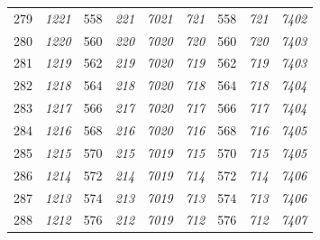 \documentclass[10pt,fleqn]{article}
\begin{document}
\begin{longtable}{c|cccccccc}
279 & {\color{blue} \it 1221 \rm} & {\color{black} 558} & {\color{blue} \it 221 \rm} & {\color{blue} \it 7021 \rm} & {\color{blue} \it 721 \rm} & {\color{black} 558} & {\color{blue} \it 721 \rm} & {\color{blue} \it 7402 \rm} \\
280 & {\color{blue} \it 1220 \rm} & {\color{black} 560} & {\color{blue} \it 220 \rm} & {\color{blue} \it 7020 \rm} & {\color{blue} \it 720 \rm} & {\color{black} 560} & {\color{blue} \it 720 \rm} & {\color{blue} \it 7403 \rm} \\
281 & {\color{blue} \it 1219 \rm} & {\color{black} 562} & {\color{blue} \it 219 \rm} & {\color{blue} \it 7020 \rm} & {\color{blue} \it 719 \rm} & {\color{black} 562} & {\color{blue} \it 719 \rm} & {\color{blue} \it 7403 \rm} \\
282 & {\color{blue} \it 1218 \rm} & {\color{black} 564} & {\color{blue} \it 218 \rm} & {\color{blue} \it 7020 \rm} & {\color{blue} \it 718 \rm} & {\color{black} 564} & {\color{blue} \it 718 \rm} & {\color{blue} \it 7404 \rm} \\
283 & {\color{blue} \it 1217 \rm} & {\color{black} 566} & {\color{blue} \it 217 \rm} & {\color{blue} \it 7020 \rm} & {\color{blue} \it 717 \rm} & {\color{black} 566} & {\color{blue} \it 717 \rm} & {\color{blue} \it 7404 \rm} \\
284 & {\color{blue} \it 1216 \rm} & {\color{black} 568} & {\color{blue} \it 216 \rm} & {\color{blue} \it 7020 \rm} & {\color{blue} \it 716 \rm} & {\color{black} 568} & {\color{blue} \it 716 \rm} & {\color{blue} \it 7405 \rm} \\
285 & {\color{blue} \it 1215 \rm} & {\color{black} 570} & {\color{blue} \it 215 \rm} & {\color{blue} \it 7019 \rm} & {\color{blue} \it 715 \rm} & {\color{black} 570} & {\color{blue} \it 715 \rm} & {\color{blue} \it 7405 \rm} \\
286 & {\color{blue} \it 1214 \rm} & {\color{black} 572} & {\color{blue} \it 214 \rm} & {\color{blue} \it 7019 \rm} & {\color{blue} \it 714 \rm} & {\color{black} 572} & {\color{blue} \it 714 \rm} & {\color{blue} \it 7406 \rm} \\
287 & {\color{blue} \it 1213 \rm} & {\color{black} 574} & {\color{blue} \it 213 \rm} & {\color{blue} \it 7019 \rm} & {\color{blue} \it 713 \rm} & {\color{black} 574} & {\color{blue} \it 713 \rm} & {\color{blue} \it 7406 \rm} \\
288 & {\color{blue} \it 1212 \rm} & {\color{black} 576} & {\color{blue} \it 212 \rm} & {\color{blue} \it 7019 \rm} & {\color{blue} \it 712 \rm} & {\color{black} 576} & {\color{blue} \it 712 \rm} & {\color{blue} \it 7407 \rm} \\

\end{longtable}
\end{document}
